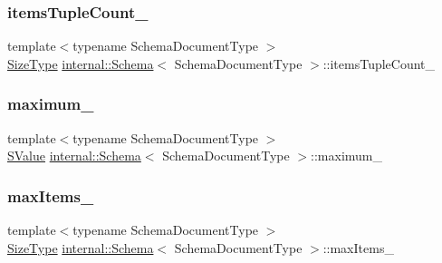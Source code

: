 \mbox{\label{classinternal_1_1Schema_ad043d5e6e6221e007ea308bb7187eb62}} 
\subsubsection{\texorpdfstring{items\+Tuple\+Count\+\_\+}{itemsTupleCount\_}}
{\footnotesize\ttfamily template$<$typename Schema\+Document\+Type $>$ \\
\hyperlink{rapidjson_8h_a5ed6e6e67250fadbd041127e6386dcb5}{Size\+Type} \hyperlink{classinternal_1_1Schema}{internal\+::\+Schema}$<$ Schema\+Document\+Type $>$\+::items\+Tuple\+Count\+\_\+\hspace{0.3cm}{\ttfamily [private]}}

\mbox{\label{classinternal_1_1Schema_a35abdff691fd5653b0a2e66b1058486f}} 
\subsubsection{\texorpdfstring{maximum\+\_\+}{maximum\_}}
{\footnotesize\ttfamily template$<$typename Schema\+Document\+Type $>$ \\
\hyperlink{classinternal_1_1Schema_ab3a07540a27d4cc2b0e260290c5c5771}{S\+Value} \hyperlink{classinternal_1_1Schema}{internal\+::\+Schema}$<$ Schema\+Document\+Type $>$\+::maximum\+\_\+\hspace{0.3cm}{\ttfamily [private]}}

\mbox{\label{classinternal_1_1Schema_ac1fbdc93dbd6d951f8c2768373331285}} 
\subsubsection{\texorpdfstring{max\+Items\+\_\+}{maxItems\_}}
{\footnotesize\ttfamily template$<$typename Schema\+Document\+Type $>$ \\
\hyperlink{rapidjson_8h_a5ed6e6e67250fadbd041127e6386dcb5}{Size\+Type} \hyperlink{classinternal_1_1Schema}{internal\+::\+Schema}$<$ Schema\+Document\+Type $>$\+::max\+Items\+\_\+\hspace{0.3cm}{\ttfamily [private]}}

